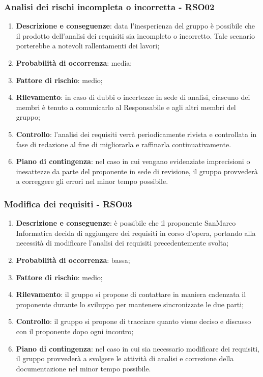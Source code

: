 	\subsubsection{Analisi dei rischi incompleta o incorretta - RSO02}
	\begin{enumerate}
		\item \textbf{Descrizione e conseguenze}: data l'inesperienza del gruppo è possibile che il prodotto dell'analisi dei requisiti sia incompleto o incorretto. Tale scenario porterebbe a notevoli rallentamenti dei lavori;
		\item \textbf{Probabilità di occorrenza}: media;
		\item \textbf{Fattore di rischio}: medio;
		\item \textbf{Rilevamento}: in caso di dubbi o incertezze in sede di analisi, ciascuno dei membri è tenuto a comunicarlo al Responsabile e agli altri membri del gruppo;		
		\item \textbf{Controllo}: l'analisi dei requisiti verrà periodicamente rivista e controllata in fase di redazione al fine di migliorarla e raffinarla continuativamente.
		\item \textbf{Piano di contingenza}: nel caso in cui vengano evidenziate imprecisioni o inesattezze da parte del proponente in sede di revisione, il gruppo provvederà a correggere gli errori nel minor tempo possibile.
	\end{enumerate}
	
	\subsubsection{Modifica dei requisiti - RSO03}
	\begin{enumerate}
		\item \textbf{Descrizione e conseguenze}: è possibile che il proponente SanMarco Informatica decida di aggiungere dei requisiti in corso d'opera, portando alla necessità di modificare l'analisi dei requisiti precedentemente svolta; 
		\item \textbf{Probabilità di occorrenza}: bassa;
		\item \textbf{Fattore di rischio}: medio;
		\item \textbf{Rilevamento}: il gruppo si propone di contattare in maniera cadenzata il proponente durante lo sviluppo per mantenere sincronizzate le due parti;
		\item \textbf{Controllo}: il gruppo si propone di tracciare quanto viene deciso e discusso con il proponente dopo ogni incontro;
		\item \textbf{Piano di contingenza}: nel caso in cui sia necessario modificare dei requisiti, il gruppo provvederà a svolgere le attività di analisi e correzione della documentazione nel minor tempo possibile.
	\end{enumerate}	
	
